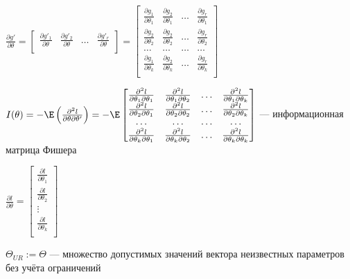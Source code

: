 \documentclass[pdftex,11pt,openany]{book}\usepackage[]{graphicx}\usepackage[]{color}
\begin{document}
\begin{problemtext}
$\frac{\partial g'}{\partial \theta} = \begin{bmatrix}
\frac{\partial g'_1}{\partial \theta} & \frac{\partial g'_2}{\partial \theta} & \ldots & \frac{\partial g'_r}{\partial \theta} \\
\end{bmatrix} = \begin{bmatrix}
\frac{\partial g_1}{\partial \theta_1} & \frac{\partial g_2}{\partial \theta_1} & \ldots & \frac{\partial g_r}{\partial \theta_1}\\
\frac{\partial g_2}{\partial \theta_2} & \frac{\partial g_2}{\partial \theta_2} & \ldots & \frac{\partial g_r}{\partial \theta_2}\\
\ldots & \ldots & \ldots & \ldots \\
\frac{\partial g_1}{\partial \theta_k} & \frac{\partial g_2}{\partial \theta_k} & \ldots & \frac{\partial g_r}{\partial \theta_k}\\
\end{bmatrix}$

$I(\theta) = -\E \left(\frac{\partial^2 l}{\partial \theta \partial \theta'}\right) = - \E \begin{bmatrix}
\frac{\partial^2 l}{\partial \theta_1 \partial \theta_1} & \frac{\partial^2 l}{\partial \theta_1 \partial \theta_2} & \ldots & \frac{\partial^2 l}{\partial \theta_1 \partial \theta_k} \\
\frac{\partial^2 l}{\partial \theta_2 \partial \theta_1} & \frac{\partial^2 l}{\partial \theta_2 \partial \theta_2} & \ldots & \frac{\partial^2 l}{\partial \theta_2 \partial \theta_k} \\
\ldots & \ldots & \ldots & \ldots \\
\frac{\partial^2 l}{\partial \theta_k \partial \theta_1} & \frac{\partial^2 l}{\partial \theta_k \partial \theta_2} & \ldots & \frac{\partial^2 l}{\partial \theta_k \partial \theta_k} \\
\end{bmatrix}$ --- информационная матрица Фишера

$\frac{\partial l}{\partial \theta} = \begin{bmatrix}
\frac{\partial l}{\partial \theta_1} \\
\frac{\partial l}{\partial \theta_2} \\
\vdots \\
\frac{\partial l}{\partial \theta_k} \\
\end{bmatrix}$

$\Theta_{UR} := \Theta$ --- множество допустимых значений вектора неизвестных параметров без учёта ограничений


\end{problemtext}
\end{document}

